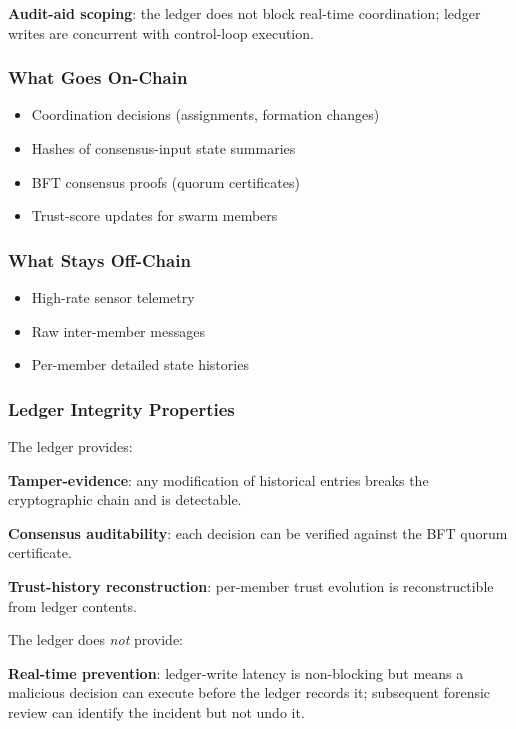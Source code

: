 \documentclass[sigconf,nonacm]{acmart}
\begin{document}
\textbf{Audit-aid scoping}: the ledger does not block real-time
coordination; ledger writes are concurrent with control-loop
execution.

\subsubsection{What Goes On-Chain}

\begin{itemize}
  \item Coordination decisions (assignments, formation changes)
  \item Hashes of consensus-input state summaries
  \item BFT consensus proofs (quorum certificates)
  \item Trust-score updates for swarm members
\end{itemize}

\subsubsection{What Stays Off-Chain}

\begin{itemize}
  \item High-rate sensor telemetry
  \item Raw inter-member messages
  \item Per-member detailed state histories
\end{itemize}

\subsubsection{Ledger Integrity Properties}

The ledger provides:

\textbf{Tamper-evidence}: any modification of historical entries
breaks the cryptographic chain and is detectable.

\textbf{Consensus auditability}: each decision can be verified
against the BFT quorum certificate.

\textbf{Trust-history reconstruction}: per-member trust evolution
is reconstructible from ledger contents.

The ledger does \emph{not} provide:

\textbf{Real-time prevention}: ledger-write latency is
non-blocking but means a malicious decision can execute before
the ledger records it; subsequent forensic review can identify
the incident but not undo it.
\end{document}
